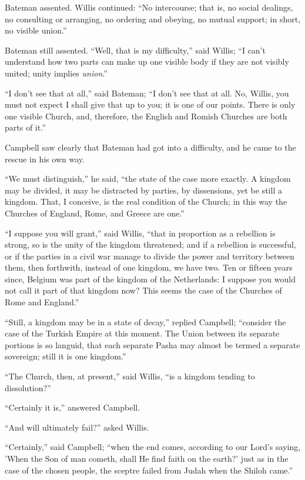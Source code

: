 Bateman assented. Willis continued: ``No intercourse; that is,
no social dealings, no consulting or arranging, no ordering and
obeying, no mutual support; in short, no visible union.''

Bateman still assented. ``Well, that is my difficulty,''
said Willis; ``I can't understand how two parts can make up one
visible body if they are not visibly united; unity implies \emph{union}.''

``I don't see that at all,'' said Bateman; ``I don't
see that at all. No, Willis, you must not expect I shall give that up
to you; it is one of our points. There is only one visible Church,
and, therefore, the English and Romish Churches are both parts of
it.''

Campbell saw clearly that Bateman had got into a difficulty, and he
came to the rescue in his own way.

``We must distinguish,'' he said, ``the state of the
case more exactly. A kingdom may be divided, it may be distracted by
parties, by dissensions, yet be still a kingdom. That, I
conceive, is the real condition of the Church; in this way the
Churches of England, Rome, and Greece are one.''

``I suppose you will grant,'' said Willis, ``that in
proportion as a rebellion is strong, so is the unity of the kingdom
threatened; and if a rebellion is successful, or if the parties in a
civil war manage to divide the power and territory between them, then
forthwith, instead of one kingdom, we have two. Ten or fifteen years
since, Belgium was part of the kingdom of the Netherlands: I suppose
you would not call it part of that kingdom now? This seems the case of
the Churches of Rome and England.''

``Still, a kingdom may be in a state of decay,'' replied
Campbell; ``consider the case of the Turkish Empire at this
moment. The Union between its separate portions is so languid, that
each separate Pasha may almost be termed a separate sovereign; still
it is one kingdom.''

``The Church, then, at present,'' said Willis, ``is a
kingdom tending to dissolution?''

``Certainly it is,'' answered Campbell.

``And will ultimately fail?'' asked Willis.

``Certainly,'' said Campbell; ``when the end comes,
according to our Lord's saying, 'When the Son of man cometh, shall He
find faith on the earth?' just as in the case of the chosen people,
the sceptre failed from Judah when the Shiloh came.''

